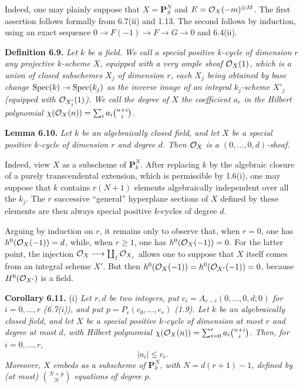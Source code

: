Indeed, one may plainly suppose that $X=\mathbf P^N_S$ and
$E=\mathcal O_X(-m)^{\oplus M}$. The first assertion follows formally from
6.7(ii) and 1.13. The second follows by induction, using an exact sequence
$0\longrightarrow F(-1)\longrightarrow F\longrightarrow G\longrightarrow0$
and 6.4(ii).

\textbf{Definition 6.9.} \emph{Let $k$ be a field. We call a
\emph{special positive $k$-cycle of dimension $r$} any projective
$k$-scheme $X$, equipped with a very ample sheaf $\mathcal O_X(1)$, which is a
union of closed subschemes $X_j$ of dimension $r$, each $X_j$ being
obtained by base change $\operatorname{Spec}(k)\to\operatorname{Spec}(k_j)$ as the inverse image of
an integral $k_j$-scheme $X'_j$ (equipped with $\mathcal O_{X'_j}(1)$). We call
the \emph{degree} of $X$ the coefficient $a_r$ in the Hilbert polynomial
$\chi(\mathcal O_X(n))=\sum_i a_i\binom{n+i}{i}$.}

\textbf{Lemma 6.10.} \emph{Let $k$ be an algebraically closed field, and let $X$ be a special positive $k$-cycle of dimension $r$ and degree $d$. Then $\mathcal O_X$ is a $(0,\ldots,0,d)$-sheaf.}

Indeed, view $X$ as a subscheme of $\mathbf P^N_k$. After replacing $k$ by the algebraic closure of a purely transcendental extension, which is permissible by 1.6(i), one may suppose that $k$ contains $r(N+1)$ elements algebraically independent over all the $k_j$. The $r$ successive ``general'' hyperplane sections of $X$ defined by these elements are then always special positive $k$-cycles of degree $d$.

Arguing by induction on $r$, it remains only to observe that, when $r=0$,
one has $h^0(\mathcal O_X(-1))=d$, while, when $r\geq1$, one has
$h^0(\mathcal O_X(-1))=0$. For the latter point, the injection
$\mathcal O_X\longrightarrow\coprod_j\mathcal O_{X_j}$ allows one to suppose that $X$
itself comes from an integral scheme $X'$. But then
$h^0(\mathcal O_X(-1))=h^0(\mathcal O_{X'}(-1))=0$, because $H^0(\mathcal O_{X'})$ is a
field.

\textbf{Corollary 6.11.} (i) \emph{Let $r,d$ be two integers, put
$c_i=A_{r-i}(0,\ldots,0,d;0)$ for $i=0,\ldots,r$ (6.7(i)), and put
$p=P_r(c_0,\ldots,c_r)$ (1.9). Let $k$ be an algebraically closed field,
and let $X$ be a special positive $k$-cycle of dimension at most $r$ and
degree at most $d$, with Hilbert polynomial
$\chi(\mathcal O_X(n))=\sum_{i=0}^{r}a_i\binom{n+i}{i}$. Then, for
$i=0,\ldots,r$,}
\[
  |a_i|\leq c_i.
\]
\emph{Moreover, $X$ embeds as a subscheme of $\mathbf P^N_k$, with
$N=d(r+1)-1$, defined by (at most) $\binom{N+p}{N}$ equations of degree
$p$.}

